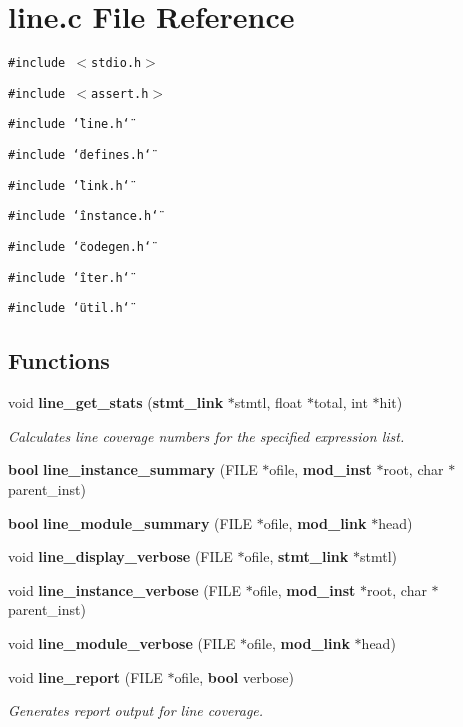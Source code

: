 \section{line.c File Reference}
\label{line_8c}
{\tt \#include $<$stdio.h$>$}\par
{\tt \#include $<$assert.h$>$}\par
{\tt \#include \char`\"{}line.h\char`\"{}}\par
{\tt \#include \char`\"{}defines.h\char`\"{}}\par
{\tt \#include \char`\"{}link.h\char`\"{}}\par
{\tt \#include \char`\"{}instance.h\char`\"{}}\par
{\tt \#include \char`\"{}codegen.h\char`\"{}}\par
{\tt \#include \char`\"{}iter.h\char`\"{}}\par
{\tt \#include \char`\"{}util.h\char`\"{}}\par
\subsection*{Functions}
\begin{CompactItemize}
\item 
void {\bf line\_\-get\_\-stats} ({\bf stmt\_\-link} $\ast$stmtl, float $\ast$total, int $\ast$hit)
\begin{CompactList}\small\item\em Calculates line coverage numbers for the specified expression list. \item\end{CompactList}\item 
{\bf bool} {\bf line\_\-instance\_\-summary} (FILE $\ast$ofile, {\bf mod\_\-inst} $\ast$root, char $\ast$parent\_\-inst)
\item 
{\bf bool} {\bf line\_\-module\_\-summary} (FILE $\ast$ofile, {\bf mod\_\-link} $\ast$head)
\item 
void {\bf line\_\-display\_\-verbose} (FILE $\ast$ofile, {\bf stmt\_\-link} $\ast$stmtl)
\item 
void {\bf line\_\-instance\_\-verbose} (FILE $\ast$ofile, {\bf mod\_\-inst} $\ast$root, char $\ast$parent\_\-inst)
\item 
void {\bf line\_\-module\_\-verbose} (FILE $\ast$ofile, {\bf mod\_\-link} $\ast$head)
\item 
void {\bf line\_\-report} (FILE $\ast$ofile, {\bf bool} verbose)
\begin{CompactList}\small\item\em Generates report output for line coverage. \item\end{CompactList}\end{CompactItemize}
